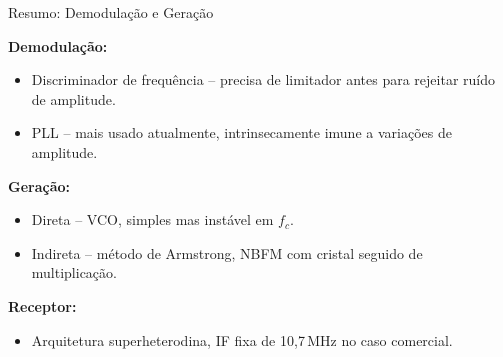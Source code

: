 
\begin{frame}{Resumo: Demodulação e Geração}

\textbf{Demodulação:}
\begin{itemize}\itemsep0pt
\item Discriminador de frequência -- precisa de limitador antes para rejeitar ruído de amplitude.
\item PLL -- mais usado atualmente, intrinsecamente imune a variações de amplitude.
\end{itemize}

\vspace{0.3cm}
\textbf{Geração:}
\begin{itemize}\itemsep0pt
\item Direta -- VCO, simples mas instável em $f_c$.
\item Indireta -- método de Armstrong, NBFM com cristal seguido de multiplicação.
\end{itemize}

\vspace{0.3cm}
\textbf{Receptor:}
\begin{itemize}\itemsep0pt
\item Arquitetura superheterodina, IF fixa de 10,7\,MHz no caso comercial.
\end{itemize}

\end{frame}
